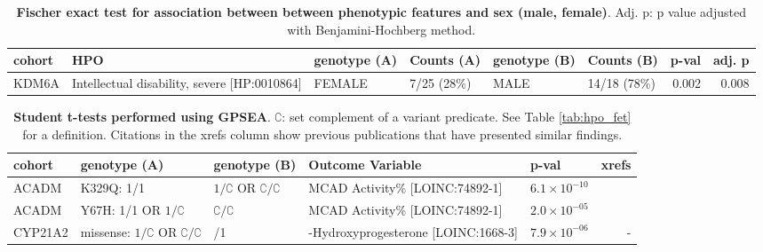 \begin{table}
\centering
\begin{scriptsize}
\begin{tabular}{l>{\raggedright}p{3cm}lp{2cm}lp{2.4cm}rr}
\toprule
\textbf{cohort} & \textbf{HPO} & \textbf{genotype (A)} & \textbf{Counts (A)} & \textbf{genotype (B)} & \textbf{Counts (B)} & \textbf{p-val} & \textbf{adj. p}\\
\midrule
KDM6A & Intellectual disability, severe [HP:0010864] & FEMALE & 7/25 (28\%) & MALE & 14/18 (78\%) & 0.002 & 0.008\\
\bottomrule
\end{tabular}
\end{scriptsize}
\caption{\textbf{Fischer exact test for association between  between phenotypic features and sex (male, female)}. Adj. p: p value adjusted with Benjamini-Hochberg method.}
\label{tab:mf_hpo}
\end{table}
\clearpage
\newpage



\begin{table}
\centering
\begin{tabular}{l>{\raggedright\arraybackslash}p{3cm}>{\raggedright\arraybackslash}p{2.5cm}>{\raggedright\arraybackslash}p{4.5cm}lr}
\toprule
\textbf{cohort} & \textbf{genotype (A)} & \textbf{genotype (B)} & \textbf{Outcome Variable} & \textbf{p-val} & \textbf{xrefs}\\
\midrule
ACADM & K329Q: 1/1 &  $1/\complement$ OR $\complement/\complement$ & MCAD Activity\% [LOINC:74892-1] & $6.1 \times 10^{-10}$ & \cite{PMID_33580884}\\
ACADM & Y67H: 1/1 OR $1/\complement$  & $\complement/\complement$ & MCAD Activity\% [LOINC:74892-1] & $2.0 \times 10^{-05}$ & \cite{PMID_33580884}\\
CYP21A2 & missense:  $1/\complement$  OR $\complement/\complement$ &  1/1 & 17-Hydroxyprogesterone [LOINC:1668-3] & $7.9 \times 10^{-06}$ & -\\
\bottomrule
\end{tabular}
\caption{\textbf{Student t-tests performed using GPSEA}. $\complement$: set complement of a variant predicate. See Table \ref{tab:hpo_fet} for a definition. Citations in the xrefs column show previous publications that have presented similar findings.}
\label{tab:t_test}
\end{table}
\clearpage
\newpage




